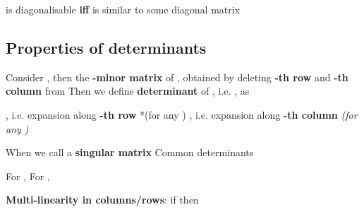  is diagonalisable \textbf{iff}  is similar to some
diagonal matrix 


\subsection*{Properties of determinants}

\begin{itemize}

      \vItem
            Consider , then
             the
            \textbf{-minor matrix} of , obtained by deleting
            \textbf{-th row} and \textbf{-th column} from
      \vItem
            Then we define \textbf{determinant} of ,
            i.e. , as

            \begin{itemize}

                  \vItem
                        ,
                        i.e. expansion along \textbf{-th row} *(for any )
                  \vItem
                        ,
                        i.e. expansion along \textbf{-th column} \emph{(for any
                              )}
            \end{itemize}
      \vItem
            When  we call  a \textbf{singular matrix}
      \vItem
            Common determinants

            \begin{itemize}

                  \vItem
                        For , 
                  \vItem
                        For , 
                  \vItem
            \end{itemize}
      \vItem
            \textbf{Multi-linearity in columns/rows}: if
            then


\end{itemize}
